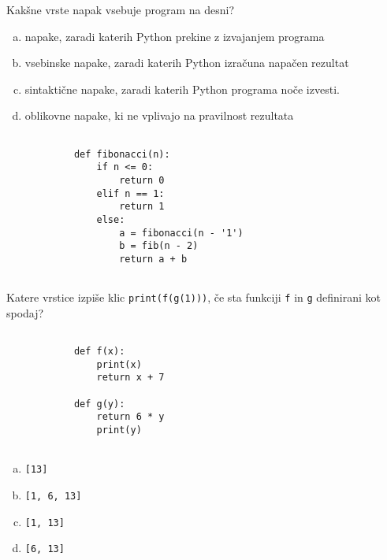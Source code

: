 \documentclass[arhiv, 10pt]{../izpit}
\newcommand{\inlinepy}[1]{\texttt{#1}}
\begin{document}
        \naloga*
        \begin{multicols}{2}
        \noindent
        Kakšne vrste napak vsebuje program na desni?

        \begin{enumerate}[(a)]
\item napake, zaradi katerih Python prekine z izvajanjem programa
\item vsebinske napake, zaradi katerih Python izračuna napačen rezultat
\item sintaktične napake, zaradi katerih Python programa noče izvesti.
\item oblikovne napake, ki ne vplivajo na pravilnost rezultata
\end{enumerate}

        \columnbreak

        \begin{verbatim}
        
            def fibonacci(n):
                if n <= 0:
                    return 0
                elif n == 1:
                    return 1
                else:
                    a = fibonacci(n - '1')
                    b = fib(n - 2)
                    return a + b
            
        \end{verbatim}

        \end{multicols}

    
        \naloga*
        Katere vrstice izpiše klic \inlinepy{print(f(g(1)))}, če sta funkciji \inlinepy{f} in \inlinepy{g} definirani kot spodaj?

        \begin{multicols}{2}
        \begin{verbatim}
        
            def f(x):
                print(x)
                return x + 7

            def g(y):
                return 6 * y
                print(y)
        
        \end{verbatim}

        \begin{enumerate}[(a)]
\item \inlinepy{[13]}
\item \inlinepy{[1, 6, 13]}
\item \inlinepy{[1, 13]}
\item \inlinepy{[6, 13]}
\end{enumerate}

        \end{multicols}
    
\end{document}
